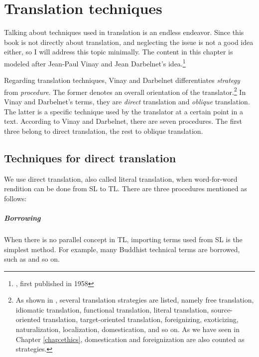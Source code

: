 \chapter{Translation techniques}\label{chap:techniques}

Talking about techniques used in translation is an endless endeavor. Since this book is not directly about translation, and neglecting the issue is not a good idea either, so I will address this topic minimally. The content in this chapter is modeled after Jean-Paul Vinay and Jean Darbelnet's idea.\footnote{\citealp[pp.~31--40]{vinaydarbelnet:comparative}, first published in 1958}

Regarding translation techniques, Vinay and Darbelnet differentiates \emph{strategy} from \emph{procedure}. The former denotes an overall orientation of the translator.\footnote{As shown in \citealp[p.~23]{munday:translation}, several translation strategies are listed, namely free translation, idiomatic translation, functional translation, literal translation, source-oriented translation, target-oriented translation, foreignizing, exoticizing, naturalization, localization, domestication, and so on. As we have seen in Chapter \ref{chap:ethics}, domestication and foreignization are also counted as strategies.} In Vinay and Darbelnet's terms, they are \emph{direct} translation and \emph{oblique} translation. The latter is a specific technique used by the translator at a certain point in a text. According to Vinay and Darbelnet, there are seven procedures. The first three belong to direct translation, the rest to oblique translation.

\section*{Techniques for direct translation}

We use direct translation, also called literal translation, when word-for-word rendition can be done from SL to TL. There are three procedures mentioned as follows:

\paragraph*{Borrowing} When there is no parallel concept in TL, importing terms used from SL is the simplest method. For example, many Buddhist technical terms are borrowed, such as  and so on.

